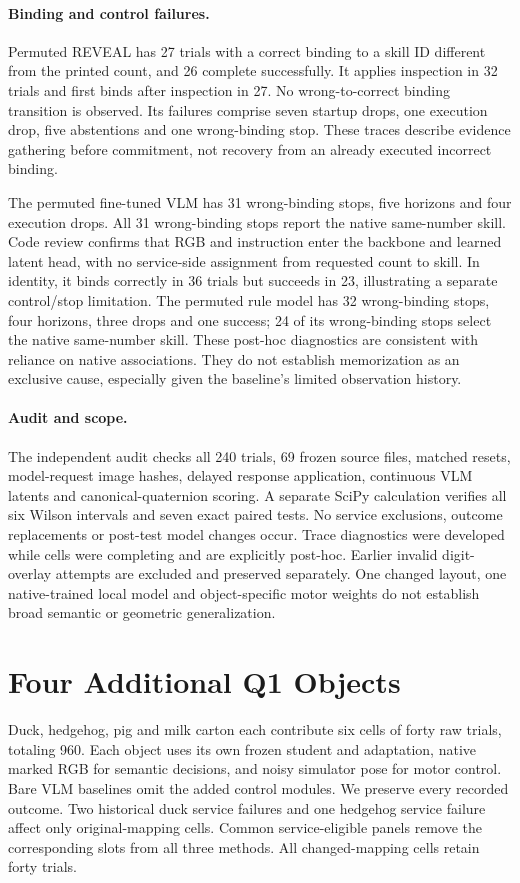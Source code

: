 \paragraph{Binding and control failures.}
Permuted REVEAL has 27 trials with a correct binding to a skill ID different from the printed count, and 26 complete successfully. It applies inspection in 32 trials and first binds after inspection in 27. No wrong-to-correct binding transition is observed. Its failures comprise seven startup drops, one execution drop, five abstentions and one wrong-binding stop. These traces describe evidence gathering before commitment, not recovery from an already executed incorrect binding.

The permuted fine-tuned VLM has 31 wrong-binding stops, five horizons and four execution drops. All 31 wrong-binding stops report the native same-number skill. Code review confirms that RGB and instruction enter the backbone and learned latent head, with no service-side assignment from requested count to skill. In identity, it binds correctly in 36 trials but succeeds in 23, illustrating a separate control/stop limitation. The permuted rule model has 32 wrong-binding stops, four horizons, three drops and one success; 24 of its wrong-binding stops select the native same-number skill. These post-hoc diagnostics are consistent with reliance on native associations. They do not establish memorization as an exclusive cause, especially given the baseline's limited observation history.



\paragraph{Audit and scope.}
The independent audit checks all 240 trials, 69 frozen source files, matched resets, model-request image hashes, delayed response application, continuous VLM latents and canonical-quaternion scoring. A separate SciPy calculation verifies all six Wilson intervals and seven exact paired tests. No service exclusions, outcome replacements or post-test model changes occur. Trace diagnostics were developed while cells were completing and are explicitly post-hoc. Earlier invalid digit-overlay attempts are excluded and preserved separately. One changed layout, one native-trained local model and object-specific motor weights do not establish broad semantic or geometric generalization.

\section{Four Additional Q1 Objects}
Duck, hedgehog, pig and milk carton each contribute six cells of forty raw trials, totaling 960. Each object uses its own frozen student and adaptation, native marked RGB for semantic decisions, and noisy simulator pose for motor control. Bare VLM baselines omit the added control modules. We preserve every recorded outcome. Two historical duck service failures and one hedgehog service failure affect only original-mapping cells. Common service-eligible panels remove the corresponding slots from all three methods. All changed-mapping cells retain forty trials.

